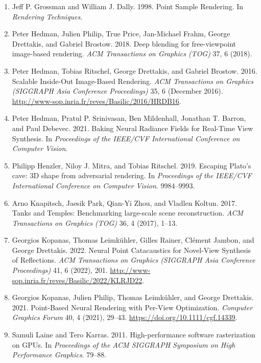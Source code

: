 \begin{enumerate}[leftmargin=2em, itemsep=0.3em, topsep=0.4em, parsep=0pt]
    \item Jeff P. Grossman and William J. Dally. 1998. Point Sample Rendering. In \textit{Rendering Techniques}.

    \item Peter Hedman, Julien Philip, True Price, Jan-Michael Frahm, George Drettakis, and Gabriel Brostow. 2018. Deep blending for free-viewpoint image-based rendering. \textit{ACM Transactions on Graphics (TOG)} 37, 6 (2018).

    \item Peter Hedman, Tobias Ritschel, George Drettakis, and Gabriel Brostow. 2016. Scalable Inside-Out Image-Based Rendering. \textit{ACM Transactions on Graphics (SIGGRAPH Asia Conference Proceedings)} 35, 6 (December 2016). \url{http://www-sop.inria.fr/reves/Basilic/2016/HRDB16}.

    \item Peter Hedman, Pratul P. Srinivasan, Ben Mildenhall, Jonathan T. Barron, and Paul Debevec. 2021. Baking Neural Radiance Fields for Real-Time View Synthesis. In \textit{Proceedings of the IEEE/CVF International Conference on Computer Vision}.

    \item Philipp Henzler, Niloy J. Mitra, and Tobias Ritschel. 2019. Escaping Plato's cave: 3D shape from adversarial rendering. In \textit{Proceedings of the IEEE/CVF International Conference on Computer Vision}. 9984--9993.

    \item Arno Knapitsch, Jaesik Park, Qian-Yi Zhou, and Vladlen Koltun. 2017. Tanks and Temples: Benchmarking large-scale scene reconstruction. \textit{ACM Transactions on Graphics (TOG)} 36, 4 (2017), 1--13.

    \item Georgios Kopanas, Thomas Leimk{\"u}hler, Gilles Rainer, Cl{\'e}ment Jambon, and George Drettakis. 2022. Neural Point Catacaustics for Novel-View Synthesis of Reflections. \textit{ACM Transactions on Graphics (SIGGRAPH Asia Conference Proceedings)} 41, 6 (2022), 201. \url{http://www-sop.inria.fr/reves/Basilic/2022/KLRJD22}.

    \item Georgios Kopanas, Julien Philip, Thomas Leimk{\"u}hler, and George Drettakis. 2021. Point-Based Neural Rendering with Per-View Optimization. \textit{Computer Graphics Forum} 40, 4 (2021), 29--43. \url{https://doi.org/10.1111/cgf.14339}.

    \item Samuli Laine and Tero Karras. 2011. High-performance software rasterization on GPUs. In \textit{Proceedings of the ACM SIGGRAPH Symposium on High Performance Graphics}. 79--88.


\end{enumerate}
